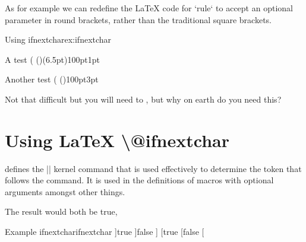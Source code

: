 As for example we can redefine the LaTeX code for `rule` to accept an optional parameter in round brackets, rather than the traditional square brackets.

\begin{texexample}{Using ifnextchar}{ex:ifnextchar}
\makeatletter
\def\Rule{\@ifnextchar(\@Rule%
        {\@Rule(\z@)}}
\def\@Rule(#1)#2#3{%
 \leavevmode
 \hbox{%
 \setlength\@tempdima{#1}%
 \setlength\@tempdimb{#2}%
 \setlength\@tempdimc{#3}%
 \advance\@tempdimc\@tempdima
 \vrule\@width\@tempdimb\@height\@tempdimc\@depth-\@tempdima}}
\makeatother

A test \Rule(6.5pt){100pt}{1pt}

Another test \Rule{100pt}{3pt}

Not that difficult but you will need to , but why on earth do you need this?
\end{texexample}




\begin{comment}
\def\elidebefore[#1]#2{[$\ldots$] #2}
\def\elideafter#1{#1$\ldots$}

\def\elide {%
\futurelet\ifoptions
    \choosemacro
}



\def\choosemacro{%
 \ifx\ifoptions [%
     \let\choice = \elidebefore 
 \else
    \let\choice = \elideafter
 \fi
\choice
}

Testing \elide[b]{Lorem ipsum}

\elide{Lorem Ipsum}

\elide[b]{Lorem ipsum}

\end{comment}


\section{Using LaTeX \protect\textbackslash @ifnextchar}

\latex defines the |\@ifnextchar| kernel command that is used effectively to
determine the token that follows the command. It is used in the definitions
of macros with optional arguments amongst other things.

\begin{teXXX}
\@ifnextchar]{true}{false}] 
 ] %
\@ifnextchar[{true [}{false} [ %
\makeatother
\end{texexample}


